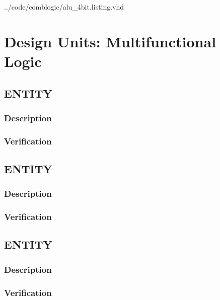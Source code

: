 \documentclass[10pt,a4paper]{report}
\begin{document}

{../code/comblogic/alu_4bit.listing.vhd}


\chapter{Design Units: Multifunctional Logic}

\section{ENTITY}
\subsection{Description}

\subsection{Verification}

\pagebreak
\section{ENTITY}
\subsection{Description}

\subsection{Verification}

\pagebreak
\section{ENTITY}
\subsection{Description}

\subsection{Verification}
\end{document}
